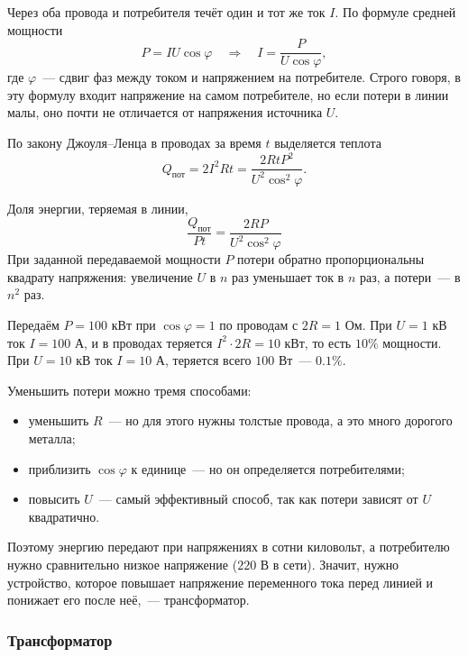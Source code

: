 \documentclass[12pt]{article}
\begin{document}
	Через оба провода и потребителя течёт один и тот же ток $I$. По формуле средней мощности
	\[
		P = IU \cos \varphi \quad \Longrightarrow \quad I = \dfrac{P}{U \cos \varphi},
	\]
	где $\varphi$~--- сдвиг фаз между током и напряжением на потребителе. Строго говоря, в эту формулу входит напряжение на самом потребителе, но если потери в линии малы, оно почти не отличается от напряжения источника $U$.
	
	По закону Джоуля--Ленца в проводах за время $t$ выделяется теплота
	\[
		Q_\text{пот} = 2 I^2 R t = \dfrac{2 R t P^2}{U^2 \cos^2 \varphi}.
	\]
	
	\begin{statement}
		Доля энергии, теряемая в линии,
		\[
			\boxed{\dfrac{Q_\text{пот}}{P t} = \dfrac{2 R P}{U^2 \cos^2 \varphi}}
		\]
		При заданной передаваемой мощности $P$ потери обратно пропорциональны квадрату напряжения: увеличение $U$ в $n$ раз уменьшает ток в $n$ раз, а потери~--- в $n^2$ раз.
	\end{statement}
	
	\begin{example}
		Передаём $P = 100$ кВт при $\cos \varphi = 1$ по проводам с $2R = 1$ Ом. При $U = 1$ кВ ток $I = 100$ А, и в проводах теряется $I^2 \cdot 2R = 10$ кВт, то есть $10\%$ мощности. При $U = 10$ кВ ток $I = 10$ А, теряется всего $100$ Вт~--- $0.1\%$.
	\end{example}
	
	\begin{note}
		Уменьшить потери можно тремя способами:
		\begin{itemize}
			\item уменьшить $R$~--- но для этого нужны толстые провода, а это много дорогого металла;
			\item приблизить $\cos \varphi$ к единице~--- но он определяется потребителями;
			\item повысить $U$~--- самый эффективный способ, так как потери зависят от $U$ квадратично.
		\end{itemize}
		Поэтому энергию передают при напряжениях в сотни киловольт, а потребителю нужно сравнительно низкое напряжение ($220$ В в сети). Значит, нужно устройство, которое повышает напряжение переменного тока перед линией и понижает его после неё,~--- трансформатор.
	\end{note}

	\subsubsection{Трансформатор}
\end{document}
